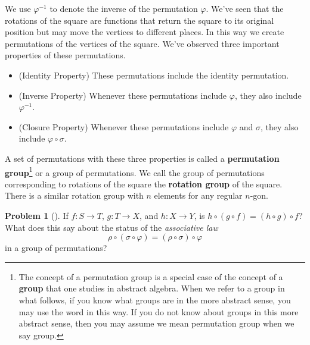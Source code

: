 \documentclass[10pt,]{book}
\newcommand{\terminology}[1]{\textbf{#1}}
\theoremstyle{plain}
\theoremstyle{definition}
\newtheorem{activity}[project]{Problem}
\theoremstyle{definition}
\numberwithin{equation}{chapter}
\begin{document}
\par
\hypertarget{p-1462}{}%
We use \(\varphi^{-1}\) to denote the inverse of the permutation \(\varphi\). We've seen that the rotations of the square are functions that return the square to its original position but may move the vertices to different places. In this way we create permutations of the vertices of the square. We've observed three important properties of these permutations. \leavevmode%
\begin{itemize}[label=\textbullet]
\item{}\hypertarget{p-1463}{}%
(Identity Property) These permutations include the identity permutation.%
\item{}\hypertarget{p-1464}{}%
(Inverse Property) Whenever these permutations include \(\varphi\), they also include \(\varphi^{-1}\).%
\item{}\hypertarget{p-1465}{}%
(Closure Property)  Whenever these permutations include \(\varphi\) and \(\sigma\), they also include \(\varphi\circ\sigma\).%
\end{itemize}
%
\par
\hypertarget{p-1466}{}%
A set of permutations with these three properties is called a \terminology{permutation group}\footnote{The concept of a permutation group is a special case of the concept of a \terminology{group} that one studies in abstract algebra.  When we refer to a group in what follows, if you  know what groups are in the more abstract sense, you may use the word in this way. If you do not know about groups in this more abstract sense, then you may assume we mean permutation group when we say group.\label{fn-20}} or a group of permutations. We call the group of permutations corresponding to rotations of the square the \terminology{rotation group} of the square. There is a similar rotation group with \(n\) elements for any regular \(n\)-gon.%
\begin{activity}[] \label{activity-252}
\hypertarget{p-1467}{}%
If \(f:S\rightarrow T\), \(g:T\rightarrow X\), and \(h:X \rightarrow Y\), is \(h\circ(g\circ f) = (h\circ g)\circ f\)? What does this say about the status of the \emph{associative law}%
\begin{equation*}
\rho\circ(\sigma\circ \varphi) = (\rho\circ \sigma)\circ\varphi
\end{equation*}
in a group of permutations?%
\end{activity}
\end{document}
